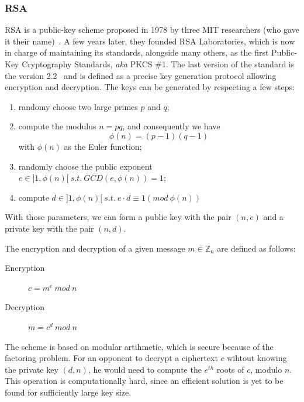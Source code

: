 \subsubsection{RSA}
RSA is a public-key scheme proposed in 1978 by three MIT researchers (who gave it their name)~\cite{Rivest:1978:MOD:359340.359342}.
A few years later, they founded RSA Laboratories, which is now in charge of maintaining its standards, alongside many others, as the first Public-Key Cryptography Standards, \textit{aka} PKCS \#1.
The last version of the standard is the version 2.2~\cite{pkcs1} and is defined as a precise key generation protocol allowing encryption and decryption.
The keys can be generated by respecting a few steps:
\begin{enumerate}
	\item randomy choose two large primes $p$ and $q$;
	\item compute the modulus $n = p q$, and consequently we have \[\phi(n) = (p-1)(q-1)\]with $\phi(n)$ as the Euler function;
	\item randomly choose the public exponent $e \in ]1,\phi(n)[\ s.t.\ GCD(e,\phi(n)) = 1$;
	\item compute $d \in ]1,\phi(n)[\ s.t.\ e \cdot d \equiv 1 (mod\ \phi(n))$
\end{enumerate}

With those parameters, we can form a public key with the pair $(n, e)$ and a private key with the pair $(n, d)$.

The encryption and decryption of a given message $m \in \mathds{Z}_n$ are defined as follows:
\begin{description}
	\item[Encryption] $c = m^e\ mod\ n$
	\item[Decryption] $m = c^d\ mod\ n$
\end{description}

The scheme is based on modular artihmetic, which is secure because of the factoring problem.
For an opponent to decrypt a ciphertext $c$ wihtout knowing the private key $(d, n)$, he would need to compute the $e^{th}$ roots of $c$, modulo $n$.
This operation is computationally hard, since an efficient solution is yet to be found for sufficiently large key size.


